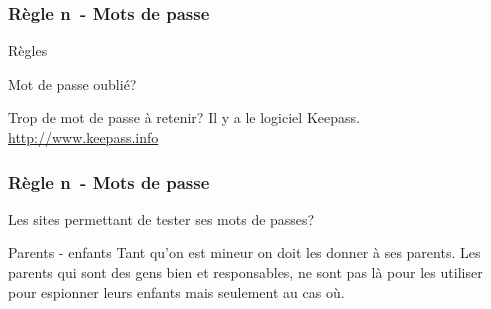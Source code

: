 \documentclass{beamer}
\newcounter{moncompteur}
\begin{document}
\begin{frame}

\frametitle{Règle n\degre \themoncompteur \  - Mots de passe}
\begin{block}{Règles}
\begin{itemize}
\end{itemize}
\end{block}

\begin{block}{Mot de passe oublié?}
\end{block}

\begin{block}{Trop de mot de passe à retenir?}
Il y a le logiciel Keepass. \url{http://www.keepass.info}
\end{block}

\end{frame}

\begin{frame}

\frametitle{Règle n\degre \themoncompteur \  - Mots de passe}
\begin{block}{Les sites permettant de tester ses mots de passes?}
\begin{itemize}
\end{itemize}
\end{block}

\begin{block}{Parents - enfants}
Tant qu’on est mineur on doit les donner à ses parents. Les parents qui sont des gens bien et responsables, ne sont pas là pour les utiliser pour espionner leurs enfants mais seulement au cas où.
\end{block}

\end{frame}
\addtocounter{moncompteur}{1}
\end{document}
